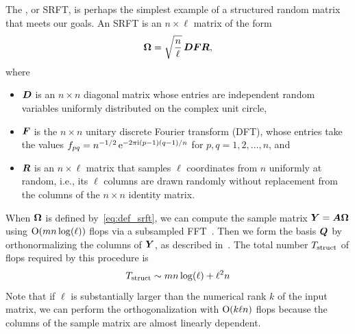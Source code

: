 \documentclass{article}
\begin{document}
The , or SRFT, is perhaps the
simplest example of a structured random matrix that meets our goals.
An SRFT is an $n \times \ell$ matrix of the form
\begin{equation}
\label{eq:def_srft}
\bm{\Omega} = \sqrt{\frac{n}{\ell}} \, \bm{DFR},
\end{equation}
where
\lsp
\begin{itemize}
\item   $\bm{D}$ is an $n \times n$ diagonal matrix whose entries are
independent random variables uniformly distributed on the complex unit circle,

\item   $\bm{F}$ is the $n \times n$ unitary discrete Fourier transform (DFT),
whose entries take the values $f_{pq} = n^{-1/2} \, \mathrm{e}^{-2\pi\mathrm{i} (p-1)(q-1)/n}$ for $p, q = 1, 2, \dots, n$, and

\item   $\bm{R}$ is an $n \times \ell$ matrix that samples $\ell$ coordinates
from $n$ uniformly at random, i.e., its $\ell$ columns are drawn randomly
without replacement from the columns of the $n \times n$ identity matrix.
\end{itemize}
\lsp

When $\bm{\Omega}$ is defined by~\eqref{eq:def_srft}, we can compute the sample
matrix $\bm{Y} = \bm{A\Omega}$ using $\mathrm{O}(mn\log(\ell))$ flops via a
subsampled FFT~\cite{random2}.
Then we form the basis $\bm{Q}$ by orthonormalizing
the columns of $\bm{Y}$, as described in~\cite[\S 4.1]{RM}. %
The total number $T_{\rm struct}$ of flops required by this procedure is
\begin{equation}
\label{eq:cost_SRFT}
T_{\rm struct} \sim mn \log(\ell) + \ell^2 n
\end{equation}
%
Note that if $\ell$ is substantially larger than the numerical rank $k$
of the input matrix, we can perform the orthogonalization with $\mathrm{O}( k \ell n)$
flops because the columns of the sample matrix are almost linearly dependent.
\end{document}
